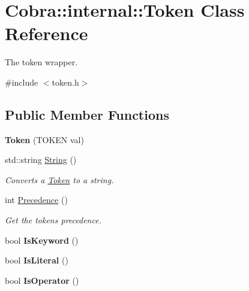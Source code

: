 \hypertarget{class_cobra_1_1internal_1_1_token}{\section{Cobra\+:\+:internal\+:\+:Token Class Reference}
\label{class_cobra_1_1internal_1_1_token}
}


The token wrapper.  




{\ttfamily \#include $<$token.\+h$>$}

\subsection*{Public Member Functions}
\begin{DoxyCompactItemize}
\item 
\hypertarget{class_cobra_1_1internal_1_1_token_a1e990f5ae45f5c16bba6fa40915b8f85}{{\bfseries Token} (T\+O\+K\+E\+N val)}\label{class_cobra_1_1internal_1_1_token_a1e990f5ae45f5c16bba6fa40915b8f85}

\item 
std\+::string \hyperlink{class_cobra_1_1internal_1_1_token_a9b435c68c2bfc19212e2dc5f78d432e9}{String} ()
\begin{DoxyCompactList}\small\item\em Converts a \hyperlink{class_cobra_1_1internal_1_1_token}{Token} to a string. \end{DoxyCompactList}\item 
int \hyperlink{class_cobra_1_1internal_1_1_token_a7ecee93c532317ef454004e21acab296}{Precedence} ()
\begin{DoxyCompactList}\small\item\em Get the tokens precedence. \end{DoxyCompactList}\item 
\hypertarget{class_cobra_1_1internal_1_1_token_a8e785fd925b773ee2d53d62bcbb5a0c5}{bool {\bfseries Is\+Keyword} ()}\label{class_cobra_1_1internal_1_1_token_a8e785fd925b773ee2d53d62bcbb5a0c5}

\item 
\hypertarget{class_cobra_1_1internal_1_1_token_a8a89dbcd9e6df18c9141e4d3e3a86c93}{bool {\bfseries Is\+Literal} ()}\label{class_cobra_1_1internal_1_1_token_a8a89dbcd9e6df18c9141e4d3e3a86c93}

\item 
\hypertarget{class_cobra_1_1internal_1_1_token_a3d421adb48da3d0fd768e3b8448a1bd9}{bool {\bfseries Is\+Operator} ()}\label{class_cobra_1_1internal_1_1_token_a3d421adb48da3d0fd768e3b8448a1bd9}

\end{DoxyCompactItemize}
